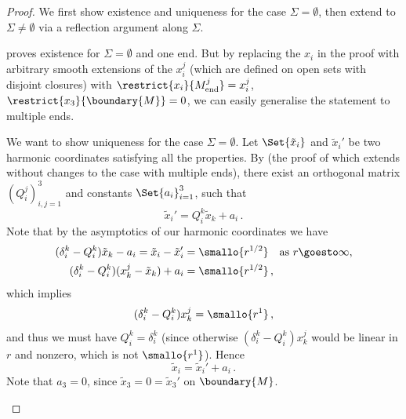 \documentclass[titlepage,numbers=noenddot,oneside,%
cleardoublepage=empty,paper=a4,fontsize=11pt,%
english,%
]{scrartcl}
\newcommand*{\mathcomma}{\,,}
\newcommand*{\mathfullstop}{\,.}
\newcommand{\Mend}{M_{\mathrm{end}}} %
\begin{document}
\begin{proof}
    We first show existence and uniqueness for the case \( \Sigma=\emptyset \), then extend to \( \Sigma\neq \emptyset \) via a reflection argument along \( \Sigma \).
 
    \begin{proofenumerate}[label=\textbf{Step \arabic*.}]
        \item \cite[Proposition 3.8]{almarazPositiveMassTheorem2016} proves existence for \( \Sigma=\emptyset \) and one end. But by replacing the \( x_i \) in the proof with arbitrary smooth extensions of the \( x_i^j \) (which are defined on open sets with disjoint closures) with \( \restrict{x_i}{\Mend^j}=x_i^j  \), \( \restrict{x_3}{\boundary{M}}=0 \), we can easily generalise the statement to multiple ends.


        
        We want to show uniqueness for the case \( \Sigma=\emptyset \). Let \( \Set{\tilde{x}_i} \) and \( \tilde{x}_i' \) be two harmonic coordinates satisfying all the properties. By \cite[Proposition 3.9]{almarazPositiveMassTheorem2016} (the proof of which extends without changes to the case with multiple ends), there exist an orthogonal matrix \( (Q_{i}^j)_{i,j=1}^3 \) and constants \( \Set{a_i}_{i=1}^3 \), such that
        \begin{equation*}
            \tilde{x}_i'=Q_i^k\tilde{x}_k+a_i\mathfullstop
        \end{equation*}
        Note that by the asymptotics of our harmonic coordinates we have 
        \begin{align*}
            (\delta_i^k-Q_i^k)\tilde{x}_k-a_i=\tilde{x}_i-\tilde{x}_i'&=\smallo{r^{1/2}} \quad \text{as \( r\goesto \infty \)},\\
            (\delta_i^k-Q_i^k)(x_k^j-\tilde{x}_k)+a_i&=\smallo{r^{1/2}}\mathcomma
        \end{align*}
        which implies 
        \begin{equation*}
            (\delta_i^k-Q_i^k)x_k^j=\smallo{r^1}\mathcomma
        \end{equation*}
        and thus we must have \( Q_i^k=\delta_i^k \) (since otherwise \( (\delta_i^k-Q_i^k)x_k^j \) would be linear in \( r \) and nonzero, which is not \( \smallo{r^1} \)). Hence
        \begin{equation*}
            \tilde{x}_i=\tilde{x}_i'+a_i\mathfullstop
        \end{equation*} 
        Note that \( a_3=0 \), since \( \tilde{x}_3=0=\tilde{x}_3' \) on \( \boundary{M} \).


\end{proofenumerate}
\end{proof}
\end{document}

